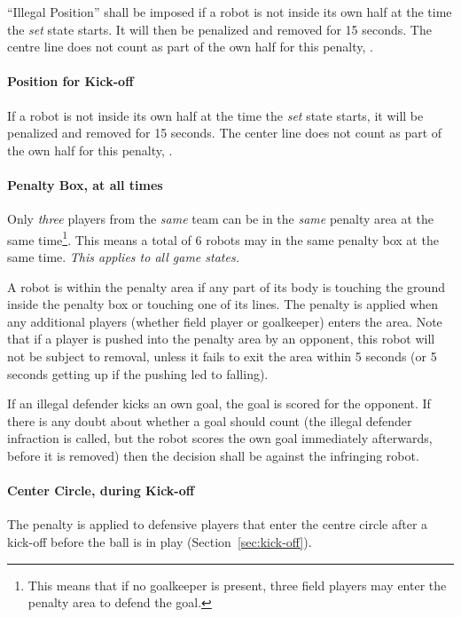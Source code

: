 ``Illegal Position'' shall be imposed if a robot is not inside its own half at the time the \textit{set} state starts. It will then be penalized and removed for 15 seconds. The centre line does not count as part of the own half for this penalty, .

\paragraph{Position for Kick-off}
If a robot is not inside its own half at the time the \textit{set} state starts, it will be penalized and removed for 15 seconds. The center line does not count as part of the own half for this penalty, .

\paragraph{Penalty Box, at all times}

Only \textit{three} players from the \textit{same} team can be in the \textit{same} penalty area at the same time\footnote{This means that if no goalkeeper is present, three field players may enter the penalty area to defend the goal.}. This means a total of 6 robots may in the same penalty box at the same time. \emph{This applies to all game states.}

A robot is within the penalty area if any part of its body is touching the ground inside the penalty box or touching one of its lines.  The penalty is applied when any additional players (whether field player or goalkeeper) enters the area. Note that if a player is pushed into the penalty area by an opponent, this robot will not be subject to removal, unless it fails to exit the area within 5 seconds (or 5 seconds  getting up if the pushing led to falling).

If an illegal defender kicks an own goal, the goal is scored for the opponent. If there is any doubt about whether a goal should count (\eg the illegal defender infraction is called, but the robot scores the own goal immediately afterwards, before it is removed) then the decision shall be against the infringing robot.

\paragraph{Center Circle, during Kick-off}

The penalty is applied to defensive players that enter the centre circle after a kick-off before the ball is in play (\cf Section~\ref{sec:kick-off}).

